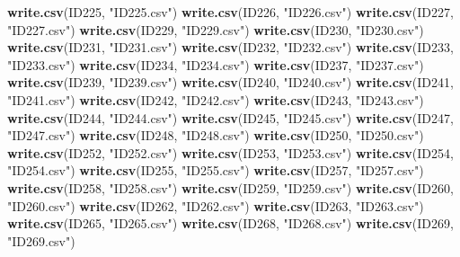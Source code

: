 \documentclass[
]{book}
\newenvironment{Shaded}{\begin{snugshade}}{\end{snugshade}}
\newcommand{\KeywordTok}[1]{\textcolor[rgb]{0.13,0.29,0.53}{\textbf{#1}}}
\newcommand{\NormalTok}[1]{#1}
\newcommand{\StringTok}[1]{\textcolor[rgb]{0.31,0.60,0.02}{#1}}
\begin{document}
\begin{Shaded}
\begin{Highlighting}[]
{{{{{{\KeywordTok{write.csv}\NormalTok{(ID225, }\StringTok{"ID225.csv"}\NormalTok{)}
\KeywordTok{write.csv}\NormalTok{(ID226, }\StringTok{"ID226.csv"}\NormalTok{)}
\KeywordTok{write.csv}\NormalTok{(ID227, }\StringTok{"ID227.csv"}\NormalTok{)}
\KeywordTok{write.csv}\NormalTok{(ID229, }\StringTok{"ID229.csv"}\NormalTok{)}
\KeywordTok{write.csv}\NormalTok{(ID230, }\StringTok{"ID230.csv"}\NormalTok{)}
\KeywordTok{write.csv}\NormalTok{(ID231, }\StringTok{"ID231.csv"}\NormalTok{)}
\KeywordTok{write.csv}\NormalTok{(ID232, }\StringTok{"ID232.csv"}\NormalTok{)}
\KeywordTok{write.csv}\NormalTok{(ID233, }\StringTok{"ID233.csv"}\NormalTok{)}
\KeywordTok{write.csv}\NormalTok{(ID234, }\StringTok{"ID234.csv"}\NormalTok{)}
\KeywordTok{write.csv}\NormalTok{(ID237, }\StringTok{"ID237.csv"}\NormalTok{)}
\KeywordTok{write.csv}\NormalTok{(ID239, }\StringTok{"ID239.csv"}\NormalTok{)}
\KeywordTok{write.csv}\NormalTok{(ID240, }\StringTok{"ID240.csv"}\NormalTok{)}
\KeywordTok{write.csv}\NormalTok{(ID241, }\StringTok{"ID241.csv"}\NormalTok{)}
\KeywordTok{write.csv}\NormalTok{(ID242, }\StringTok{"ID242.csv"}\NormalTok{)}
\KeywordTok{write.csv}\NormalTok{(ID243, }\StringTok{"ID243.csv"}\NormalTok{)}
\KeywordTok{write.csv}\NormalTok{(ID244, }\StringTok{"ID244.csv"}\NormalTok{)}
\KeywordTok{write.csv}\NormalTok{(ID245, }\StringTok{"ID245.csv"}\NormalTok{)}
\KeywordTok{write.csv}\NormalTok{(ID247, }\StringTok{"ID247.csv"}\NormalTok{)}
\KeywordTok{write.csv}\NormalTok{(ID248, }\StringTok{"ID248.csv"}\NormalTok{)}
\KeywordTok{write.csv}\NormalTok{(ID250, }\StringTok{"ID250.csv"}\NormalTok{)}
\KeywordTok{write.csv}\NormalTok{(ID252, }\StringTok{"ID252.csv"}\NormalTok{)}
\KeywordTok{write.csv}\NormalTok{(ID253, }\StringTok{"ID253.csv"}\NormalTok{)}
\KeywordTok{write.csv}\NormalTok{(ID254, }\StringTok{"ID254.csv"}\NormalTok{)}
\KeywordTok{write.csv}\NormalTok{(ID255, }\StringTok{"ID255.csv"}\NormalTok{)}
\KeywordTok{write.csv}\NormalTok{(ID257, }\StringTok{"ID257.csv"}\NormalTok{)}
\KeywordTok{write.csv}\NormalTok{(ID258, }\StringTok{"ID258.csv"}\NormalTok{)}
\KeywordTok{write.csv}\NormalTok{(ID259, }\StringTok{"ID259.csv"}\NormalTok{)}
\KeywordTok{write.csv}\NormalTok{(ID260, }\StringTok{"ID260.csv"}\NormalTok{)}
\KeywordTok{write.csv}\NormalTok{(ID262, }\StringTok{"ID262.csv"}\NormalTok{)}
\KeywordTok{write.csv}\NormalTok{(ID263, }\StringTok{"ID263.csv"}\NormalTok{)}
\KeywordTok{write.csv}\NormalTok{(ID265, }\StringTok{"ID265.csv"}\NormalTok{)}
\KeywordTok{write.csv}\NormalTok{(ID268, }\StringTok{"ID268.csv"}\NormalTok{)}
\KeywordTok{write.csv}\NormalTok{(ID269, }\StringTok{"ID269.csv"}\NormalTok{)}
}}}}}}
\end{Highlighting}
\end{Shaded}
\end{document}
